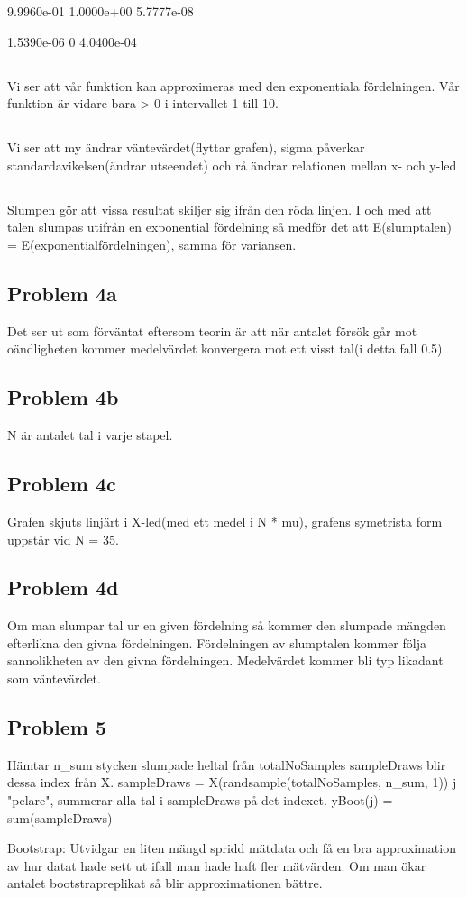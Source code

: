 \documentclass{article}
\begin{document}
   9.9960e-01
   1.0000e+00
   5.7777e-08

   1.5390e-06
            0
   4.0400e-04
\subsection{}
Vi ser att vår funktion kan approximeras med den exponentiala fördelningen. Vår funktion är vidare bara > 0 i intervallet 1 till 10.
\subsection{}
Vi ser att my ändrar väntevärdet(flyttar grafen), sigma påverkar
standardavikelsen(ändrar utseendet) och rå ändrar relationen mellan x- och
y-led
\subsection{}
Slumpen gör att vissa resultat skiljer sig ifrån den röda linjen. I och med att talen slumpas utifrån en exponential fördelning så medför det att E(slumptalen) = E(exponentialfördelningen), samma för variansen.

\subsection{Problem 4a}
Det ser ut som förväntat eftersom teorin är att när antalet försök går mot oändligheten kommer medelvärdet konvergera mot ett visst tal(i detta fall 0.5).
\subsection{Problem 4b}
N är antalet tal i varje stapel.
\subsection{Problem 4c}
Grafen skjuts linjärt i X-led(med ett medel i N * mu), grafens symetrista form uppstår vid N = 35.
\subsection{Problem 4d}
Om man slumpar tal ur en given fördelning så kommer den slumpade mängden
efterlikna den givna fördelningen. Fördelningen av slumptalen kommer följa
sannolikheten av den givna fördelningen. Medelvärdet kommer bli typ likadant som
väntevärdet.
\subsection{Problem 5}
Hämtar n\_sum stycken slumpade heltal från totalNoSamples sampleDraws blir
dessa index från X.  sampleDraws = X(randsample(totalNoSamples, n\_sum, 1)) j
"pelare", summerar alla tal i sampleDraws på det indexet.  yBoot(j) =
sum(sampleDraws)

Bootstrap: Utvidgar en liten mängd spridd mätdata och få en bra approximation av
hur datat hade sett ut ifall man hade haft fler mätvärden. Om man ökar antalet
bootstrapreplikat så blir approximationen bättre.
\end{document}

